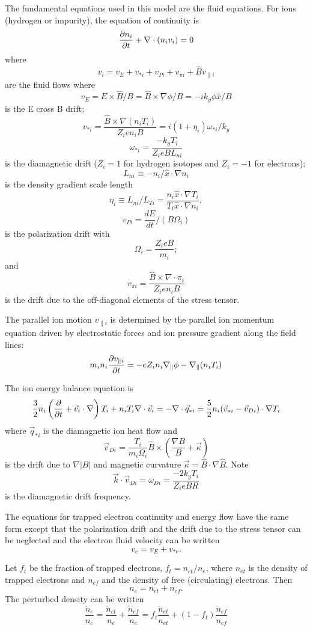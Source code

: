 The fundamental equations used in this model are the fluid equations.
For ions (hydrogen or impurity), the equation of continuity is
\[ \frac{\partial n_i}{\partial t} + \nabla \cdot ( n_i v_i ) = 0 \]
where
\[ v_i = v_E + v_{*i} + v_{Pi} + v_{\pi i}
   + \hat{B} v_{\parallel i} \]
are the fluid flows where
\[ v_E = E \times \hat{B} / B = \hat{B} \times \nabla \phi / B
 = - i k_y \phi \hat{x} / B \]
is the E cross B drift;
\[ v_{*i} = \frac{ \hat{B} \times \nabla ( n_i T_i )}{Z_i e n_i B}
 = i ( 1 + \eta_i ) \omega_{*i} / k_y \]
\[ \omega_{*i} = \frac{ - k_y T_i }{ Z_i e B L_{ni} } \]
is the diamagnetic drift ($ Z_i = 1 $ for hydrogen isotopes and
$ Z_i = -1 $ for electrons);
\[ L_{ni} \equiv - n_i / \hat{x} \cdot \nabla n_i \]
is the density gradient scale length
\[ \eta_i \equiv L_{ni} / L_{Ti}
 = \frac{n_i \hat{x} \cdot \nabla T_i}{T_i \hat{x} \cdot \nabla n_i}, \]
\[ v_{Pi} = \frac{ d E }{ dt } / ( B \Omega_i ) \]
is the polarization drift with
\[ \Omega_i = \frac{ Z_i e B }{ m_i}; \]
and
\[ v_{\pi i} = \frac{ \hat{B} \times \nabla \cdot \pi_i}{
  Z_i e n_i B } \]
is the drift due to the off-diagonal elements of the stress tensor.

The parallel ion motion $ v_{\parallel i} $ is determined by the parallel
ion momentum equation driven by electrostatic forces and ion pressure
gradient along the field lines\cite{weil92d}:
\[ m_i n_i \frac{\partial v_{\parallel i}}{\partial t}
  = - e Z_i n_i \nabla_{\parallel} \phi
  - \nabla_{\parallel} ( n_i T_i ) \]

\noindent
The ion energy balance equation is
\[ \frac{3}{2} n_i \left( \frac{\partial  }{\partial t} + \vec{v}_i \cdot \nabla \right) T_i
  + n_i T_i \nabla \cdot \vec{v}_i = - \nabla \cdot \vec{q}_{*i}
  = \frac{5}{2} n_i ( \vec{v}_{*i} - \vec{v}_{Di} ) \cdot \nabla T_i \]
where $ \vec{q}_{*i} $ is the diamagnetic ion heat flow and
\[ \vec{v}_{Di} = \frac{T_i}{m_i \Omega_i} \hat{B} \times 
  \left( \frac{\nabla B}{B} + \vec{\kappa} \right) \]
is the drift due to $\nabla |B|$ and magnetic curvature
$ \vec{\kappa} = \hat{B} \cdot \nabla \hat{B} $.  Note
\[ \vec{k} \cdot \vec{v}_{Di} = \omega_{Di} = \frac{-2 k_y T_i}{Z_i e B R} \]
is the diamagnetic drift frequency.

The equations for trapped electron continuity and energy flow have
the same form except that the polarization drift and the drift
due to the stress tensor
can be neglected and the electron fluid velocity can be written
\[ v_e = v_E +  v_{*e}.\]

Let $f_t$ be the fraction of trapped electrons, $ f_t = n_{et} / n_e $,
where $n_{et}$ is the density of trapped electrons and
$n_{ef}$ and the density of free (circulating) electrons.  Then
\[ n_e = n_{et} + n_{ef}. \]
The perturbed density can be written
\[ \frac{\tilde{n}_e}{n_e}
 =  \frac{\tilde{n}_{et}}{n_e} + \frac{\tilde{n}_{ef}}{n_e}
 =  f_t \frac{\tilde{n}_{et}}{n_{et}}
       + ( 1 - f_t ) \frac{\tilde{n}_{ef}}{n_{ef}} \]

